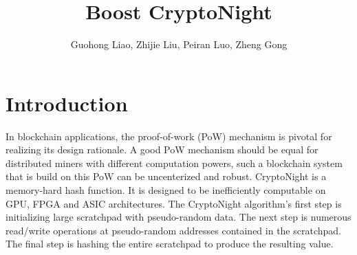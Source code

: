 \documentclass{article}
\title{Boost CryptoNight}
\author{Guohong Liao, Zhijie Liu, Peiran Luo, Zheng Gong}
\date{}
\begin{document}
\maketitle

\section{Introduction}
In blockchain applications, the proof-of-work (PoW) mechanism is pivotal for realizing its design rationale. A good PoW mechanism should be equal for distributed miners with different computation powers, such a blockchain system that is build on this PoW can be uncenterized and robust. CryptoNight is a memory-hard hash function. It is designed to be inefficiently computable on GPU, FPGA and ASIC architectures. The CryptoNight algorithm's first step is initializing large scratchpad with pseudo-random data. The next step is numerous read/write operations at pseudo-random addresses contained in the scratchpad. The final step is hashing the entire scratchpad to produce the resulting value.
\end{document}
